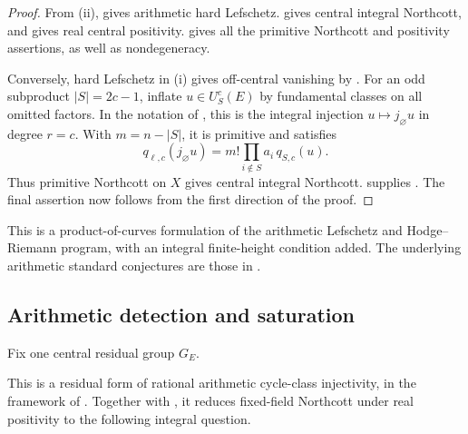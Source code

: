 \begin{proof}
From (ii),  gives arithmetic hard
Lefschetz.  gives central integral
Northcott, and  gives real central
positivity.  gives all the
primitive Northcott and positivity assertions, as well as
nondegeneracy.

Conversely, hard Lefschetz in (i) gives off-central vanishing by
. For an odd subproduct \(|S|=2c-1\),
inflate \(u\in U_S^c(E)\) by fundamental classes on all omitted
factors. In the notation of , this is
the integral injection \(u\mapsto j_\varnothing u\) in degree
\(r=c\). With \(m=n-|S|\), it is primitive and satisfies
\[
 q_{\ell,c}(j_\varnothing u)
       =m!\prod_{i\notin S}a_i\,q_{S,c}(u).
\]
Thus primitive Northcott on \(X\) gives central integral
Northcott.  supplies
. The final assertion now
follows from the first direction of the proof.
\end{proof}

This is a product-of-curves formulation of the arithmetic
Lefschetz and Hodge--Riemann program, with an integral finite-height
condition added. The underlying arithmetic standard conjectures
are those in \cite[Conjecture~2.3.1]{ZhangStandard}.

\subsection{Arithmetic detection and saturation}
\label{sec:detection-conjectures}

Fix one central residual group \(G_E\).


This is a residual form of rational arithmetic cycle-class
injectivity, in the framework of \cite{Raskind,Kahn}. Together
with , it reduces fixed-field
Northcott under real positivity to the following integral question.


